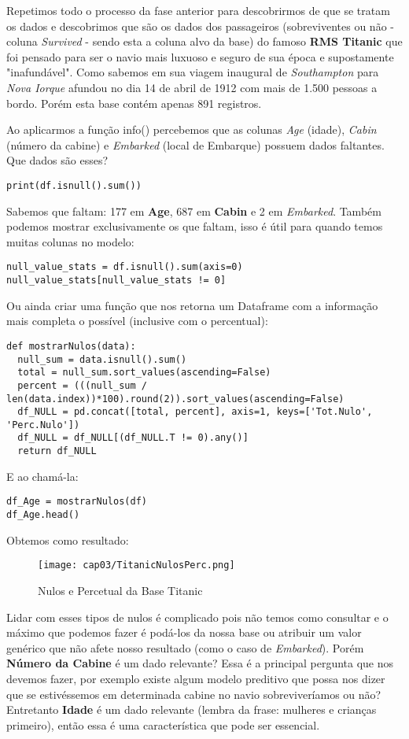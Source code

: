 Repetimos todo o processo da fase anterior para descobrirmos de que se tratam os dados e descobrimos que são os dados dos passageiros (sobreviventes ou não - coluna \textit{Survived} - sendo esta a coluna alvo da base) do famoso \textbf{RMS Titanic} que foi pensado para ser o navio mais luxuoso e seguro de sua época e supostamente "inafundável". Como sabemos em sua viagem inaugural de \textit{Southampton} para \textit{Nova Iorque} afundou no dia 14 de abril de 1912 com mais de 1.500 pessoas a bordo. Porém esta base contém apenas 891 registros.

Ao aplicarmos a função info() percebemos que as colunas \textit{Age} (idade), \textit{Cabin} (número da cabine) e \textit{Embarked} (local de Embarque) possuem dados faltantes. Que dados são esses?
\begin{lstlisting}
print(df.isnull().sum())
\end{lstlisting}

Sabemos que faltam: 177 em \textbf{Age}, 687 em \textbf{Cabin} e 2 em \textit{Embarked}. Também podemos mostrar exclusivamente os que faltam, isso é útil para quando temos muitas colunas no modelo:
\begin{lstlisting}
null_value_stats = df.isnull().sum(axis=0)
null_value_stats[null_value_stats != 0]
\end{lstlisting}

Ou ainda criar uma função que nos retorna um Dataframe com a informação mais completa o possível (inclusive com o percentual):
\begin{lstlisting}
def mostrarNulos(data):
  null_sum = data.isnull().sum()
  total = null_sum.sort_values(ascending=False)
  percent = (((null_sum / len(data.index))*100).round(2)).sort_values(ascending=False)
  df_NULL = pd.concat([total, percent], axis=1, keys=['Tot.Nulo', 'Perc.Nulo'])
  df_NULL = df_NULL[(df_NULL.T != 0).any()]
  return df_NULL
\end{lstlisting}

E ao chamá-la:
\begin{lstlisting}
df_Age = mostrarNulos(df)
df_Age.head()
\end{lstlisting}

Obtemos como resultado:
\begin{figure}[H]
	\centering
	\texttt{[image: cap03/TitanicNulosPerc.png]}
	\caption{Nulos e Percetual da Base Titanic}
\end{figure}

Lidar com esses tipos de nulos é complicado pois não temos como consultar e o máximo que podemos fazer é podá-los da nossa base ou atribuir um valor genérico que não afete nosso resultado (como o caso de \textit{Embarked}). Porém \textbf{Número da Cabine} é um dado relevante? Essa é a principal pergunta que nos devemos fazer, por exemplo existe algum modelo preditivo que possa nos dizer que se estivéssemos em determinada cabine no navio sobreviveríamos ou não? Entretanto \textbf{Idade} é um dado relevante (lembra da frase: mulheres e crianças primeiro), então essa é uma característica que pode ser essencial.

